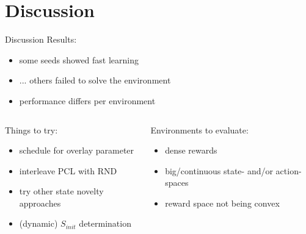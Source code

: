 \documentclass[aspectratio=169]{beamer}
\begin{document}
\section{Discussion}
\begin{frame}{Discussion}
  Results:
  \begin{itemize}
    \item some seeds showed fast learning
    \item ... others failed to solve the environment
    \item performance differs per environment
  \end{itemize}
  \vfill
  \begin{columns}[T]
    \begin{column}{0.48\textwidth}
      Things to try:
      \begin{itemize}
        \item schedule for overlay parameter
        \item interleave PCL with RND
        \item try other state novelty approaches
        \item (dynamic) $S_{init}$ determination
      \end{itemize}
    \end{column}
    \begin{column}{0.48\textwidth}
      Environments to evaluate:
      \begin{itemize}
        \item dense rewards
        \item big/continuous state- and/or action-spaces
        \item reward space not being convex
      \end{itemize}
    \end{column}
  \end{columns}
\end{frame}
\end{document}
